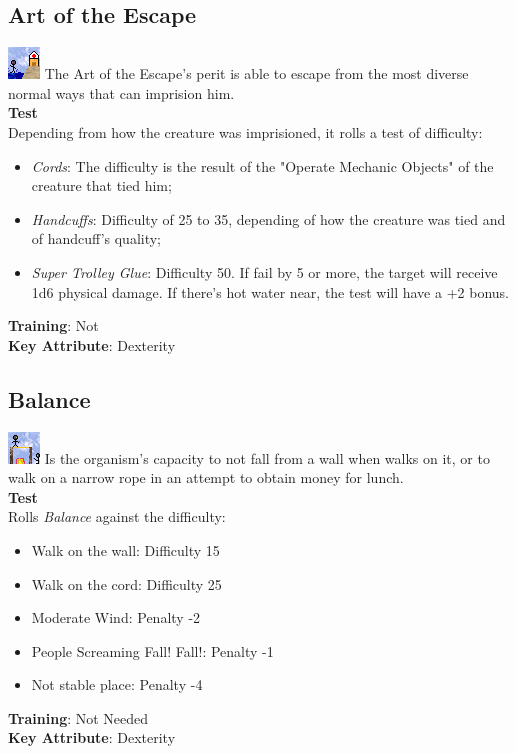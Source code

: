 \documentclass[ letterpaper,12pt]{article}
\begin{document}
\subsection{Art of the Escape} 
\includegraphics{../data/skills/Img/artedoescape.png}
The Art of the Escape's perit is able to escape from the most diverse normal ways that can imprision him.\\
{\bf Test}\\
Depending from how the creature was imprisioned, it rolls a test of difficulty:\\
\begin{itemize}
\item{{\it Cords}: The difficulty is the result of the "Operate Mechanic Objects" of the creature that tied him;}
\item{{\it Handcuffs}: Difficulty of 25 to 35, depending of how the creature was tied and of handcuff's quality;}
\item{{\it Super Trolley Glue}: Difficulty 50. If fail by 5 or more, the target will receive 1d6 physical damage. If there's hot water near, the test will have a +2 bonus.}
\end{itemize}
{\bf Training}: Not\\
{\bf Key Attribute}: Dexterity

\subsection{Balance}
\includegraphics{../data/skills/Img/equilibrio.png}
Is the organism's capacity to not fall from a wall when walks on it, or to walk on a narrow rope in an attempt to obtain money for lunch.\\
{\bf Test}\\
Rolls {\it Balance} against the difficulty:\\
\begin{itemize}
\item{Walk on the wall: Difficulty 15}
\item{Walk on the cord: Difficulty 25}
\item{Moderate Wind: Penalty -2}
\item{People Screaming Fall! Fall!: Penalty -1}
\item{Not stable place: Penalty -4}
\end{itemize}
{\bf Training}: Not Needed\\
{\bf Key Attribute}: Dexterity
\end{document}

